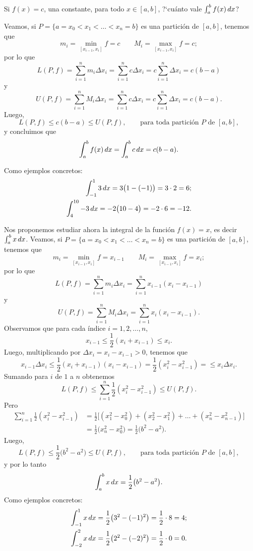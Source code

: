 \begin{example}
  Si $f(x)=c$, una constante, para todo $x\in[a,b]$, ?`cuánto vale $\int_a^b f(x)\,dx$?

  Veamos, si $P=\{a=x_0<x_1<\dots<x_n=b\}$ es una partición de $[a,b]$, tenemos que 
\[ 
    m_i = \min_{[x_{i-1},x_i]}f = c
    \qquad
    M_i = \max_{[x_{i-1},x_i]}f = c;
  \]
  por lo que 
  \[
  L(P,f)
  = \sum_{i=1}^n m_i \Delta x_i
  = \sum_{i=1}^n c \Delta x_i
  = c \sum_{i=1}^n \Delta x_i
  = c (b-a)
  \]
  y 
  \[
  U(P,f)
  = \sum_{i=1}^n M_i \Delta x_i
  = \sum_{i=1}^n c \Delta x_i
  = c \sum_{i=1}^n \Delta x_i
  = c (b-a).
  \]
  Luego, 
  \[
    L(P,f)\le c(b-a)\le U(P,f),
    \qquad\text{para toda partición $P$ de $[a,b]$},
  \]
  y concluimos que 
  \[
  \int_a^b f(x)\,dx = \int_a^b c \,dx = c (b-a).
  \]

  Como ejemplos concretos:
  \begin{align*}
    \int_{-1}^1 3 \,dx = 3 \big(1 - (-1)\big) = 3 \cdot 2 = 6;
    \\
    \int_{4}^{10} -3 \,dx = -2 \big(10 - 4\big) = -2 \cdot 6 = -12.
  \end{align*}
\end{example}

\begin{example}
  Nos proponemos estudiar ahora la integral de la función $f(x)=x$, es decir $\int_a^b x\,dx$.
  Veamos, si $P=\{a=x_0<x_1<\dots<x_n=b\}$ es una partición de $[a,b]$, tenemos que 
  \[ 
      m_i = \min_{[x_{i-1},x_i]}f = x_{i-1}
      \qquad
      M_i = \max_{[x_{i-1},x_i]}f = x_i;
    \]
    por lo que 
    \[
    L(P,f)
    = \sum_{i=1}^n m_i \Delta x_i
    = \sum_{i=1}^n x_{i-1} (x_{i}-x_{i-1})
    \]
    y 
    \[
    U(P,f)
    = \sum_{i=1}^n M_i \Delta x_i
    = \sum_{i=1}^n x_{i} (x_{i}-x_{i-1}).
    \]
    Observamos que para cada índice $i=1,2,\dots,n$, 
    \[
    x_{i-1}\le \frac12 (x_i+x_{i-1})\le x_i.
    \]
    Luego, multiplicando por $\Delta x_i = x_i-x_{i-1}>0$, tenemos que
    \[
    x_{i-1} \Delta x_i 
    \le \frac12 (x_i+x_{i-1})(x_i-x_{i-1}) 
    = \frac12 (x_i^2-x_{i-1}^2) = 
    \le x_i \Delta x_i.
    \]
    Sumando para $i$ de $1$ a $n$ obtenemos
    \[
    L(P,f) \le \sum_{i=1}^n \frac12 (x_i^2-x_{i-1}^2) \le U(P,f).
    \]
    Pero 
    \begin{align*}
      \sum_{i=1}^n \frac12 (x_i^2-x_{i-1}^2)
      &= \frac12 \Big[ (x_1^2-x_0^2) + (x_2^2-x_1^2) + \dots + (x_n^2-x_{n-1}^2)  \Big]
      \\
      &= \frac12 \big(x_n^2-x_0^2\big)
      = \frac12 \big(b^2-a^2\big).
    \end{align*}
    Luego, 
    \[
      L(P,f)\le \frac12 \big(b^2-a^2\big) \le U(P,f),
      \qquad\text{para toda partición $P$ de $[a,b]$},
    \]
    y por lo tanto
    \[
    \int_a^b x\,dx = \frac12 \big(b^2-a^2\big).
    \]
    Como ejemplos concretos:
    \begin{align*}
      \int_{-1}^1 x \,dx = \frac12 \big(3^2 - (-1)^2\big) = \frac12 \cdot 8 = 4;
      \\
      \int_{-2}^{2} x \,dx = \frac12 \big(2^2 - (-2)^2\big) = \frac12 \cdot 0 = 0.
    \end{align*}\end{example}

